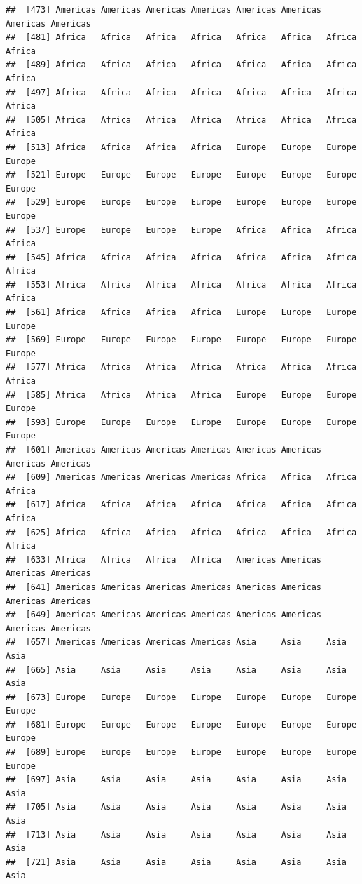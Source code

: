\documentclass[
]{article}
\begin{document}
\begin{verbatim}
##  [473] Americas Americas Americas Americas Americas Americas Americas Americas
##  [481] Africa   Africa   Africa   Africa   Africa   Africa   Africa   Africa  
##  [489] Africa   Africa   Africa   Africa   Africa   Africa   Africa   Africa  
##  [497] Africa   Africa   Africa   Africa   Africa   Africa   Africa   Africa  
##  [505] Africa   Africa   Africa   Africa   Africa   Africa   Africa   Africa  
##  [513] Africa   Africa   Africa   Africa   Europe   Europe   Europe   Europe  
##  [521] Europe   Europe   Europe   Europe   Europe   Europe   Europe   Europe  
##  [529] Europe   Europe   Europe   Europe   Europe   Europe   Europe   Europe  
##  [537] Europe   Europe   Europe   Europe   Africa   Africa   Africa   Africa  
##  [545] Africa   Africa   Africa   Africa   Africa   Africa   Africa   Africa  
##  [553] Africa   Africa   Africa   Africa   Africa   Africa   Africa   Africa  
##  [561] Africa   Africa   Africa   Africa   Europe   Europe   Europe   Europe  
##  [569] Europe   Europe   Europe   Europe   Europe   Europe   Europe   Europe  
##  [577] Africa   Africa   Africa   Africa   Africa   Africa   Africa   Africa  
##  [585] Africa   Africa   Africa   Africa   Europe   Europe   Europe   Europe  
##  [593] Europe   Europe   Europe   Europe   Europe   Europe   Europe   Europe  
##  [601] Americas Americas Americas Americas Americas Americas Americas Americas
##  [609] Americas Americas Americas Americas Africa   Africa   Africa   Africa  
##  [617] Africa   Africa   Africa   Africa   Africa   Africa   Africa   Africa  
##  [625] Africa   Africa   Africa   Africa   Africa   Africa   Africa   Africa  
##  [633] Africa   Africa   Africa   Africa   Americas Americas Americas Americas
##  [641] Americas Americas Americas Americas Americas Americas Americas Americas
##  [649] Americas Americas Americas Americas Americas Americas Americas Americas
##  [657] Americas Americas Americas Americas Asia     Asia     Asia     Asia    
##  [665] Asia     Asia     Asia     Asia     Asia     Asia     Asia     Asia    
##  [673] Europe   Europe   Europe   Europe   Europe   Europe   Europe   Europe  
##  [681] Europe   Europe   Europe   Europe   Europe   Europe   Europe   Europe  
##  [689] Europe   Europe   Europe   Europe   Europe   Europe   Europe   Europe  
##  [697] Asia     Asia     Asia     Asia     Asia     Asia     Asia     Asia    
##  [705] Asia     Asia     Asia     Asia     Asia     Asia     Asia     Asia    
##  [713] Asia     Asia     Asia     Asia     Asia     Asia     Asia     Asia    
##  [721] Asia     Asia     Asia     Asia     Asia     Asia     Asia     Asia    

\end{verbatim}
\end{document}
